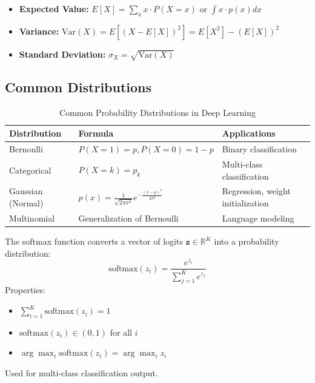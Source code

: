 \begin{itemize}
    \item \textbf{Expected Value:} $E[X] = \sum_x x \cdot P(X=x)$ or $\int x \cdot p(x) dx$
    \item \textbf{Variance:} $\text{Var}(X) = E[(X - E[X])^2] = E[X^2] - (E[X])^2$
    \item \textbf{Standard Deviation:} $\sigma_X = \sqrt{\text{Var}(X)}$
\end{itemize}

\subsection{Common Distributions}

\begin{table}[ht]
    \centering
    \caption{Common Probability Distributions in Deep Learning}
    \begin{tabular}{L{3cm} L{4cm} L{5cm}}
        \toprule
        \textbf{Distribution} & \textbf{Formula} & \textbf{Applications} \\
        \midrule
        Bernoulli & $P(X=1) = p, P(X=0) = 1-p$ & Binary classification \\
        Categorical & $P(X=k) = p_k$ & Multi-class classification \\
        Gaussian (Normal) & $p(x) = \frac{1}{\sqrt{2\pi\sigma^2}}e^{-\frac{(x-\mu)^2}{2\sigma^2}}$ & Regression, weight initialization \\
        Multinomial & Generalization of Bernoulli & Language modeling \\
        \bottomrule
    \end{tabular}
\end{table}

\begin{example}
The softmax function converts a vector of logits $\mathbf{z} \in \mathbb{R}^K$ into a probability distribution:
\begin{equation}
\text{softmax}(z_i) = \frac{e^{z_i}}{\sum_{j=1}^{K} e^{z_j}}
\end{equation}
Properties:
\begin{itemize}
    \item $\sum_{i=1}^{K} \text{softmax}(z_i) = 1$
    \item $\text{softmax}(z_i) \in (0, 1)$ for all $i$
    \item $\arg\max_i \text{softmax}(z_i) = \arg\max_i z_i$
\end{itemize}
Used for multi-class classification output.
\end{example}

